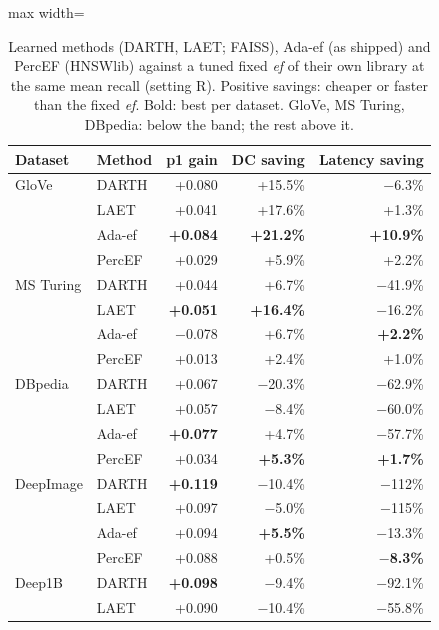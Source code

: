 \documentclass[10pt,journal,compsoc]{IEEEtran}
\newcommand{\ef}{\textit{ef}}
\begin{document}
\begin{table}[t]
  \caption{Learned methods (DARTH, LAET; FAISS), Ada-ef (as shipped) and PercEF (HNSWlib) against a
  tuned fixed \ef{} of their own library at the same mean recall (setting R). Positive savings:
  cheaper or faster than the fixed \ef{}. Bold: best per dataset. GloVe, MS Turing, DBpedia: below
  the band; the rest above it.}
  \label{tab:darth}
  \centering\footnotesize
  \begin{adjustbox}{max width=\linewidth}\begin{tabular}{llrrr}
    \toprule
    Dataset & Method & p1 gain & DC saving & Latency saving \\
    \midrule
    GloVe         & DARTH  & +0.080 & +15.5\% & $-$6.3\% \\
                  & LAET   & +0.041 & +17.6\% & +1.3\% \\
                  & Ada-ef & \textbf{+0.084} & \textbf{+21.2\%} & \textbf{+10.9\%} \\
                  & PercEF & +0.029 & +5.9\% & +2.2\% \\
    \midrule
    MS Turing     & DARTH  & +0.044 & +6.7\% & $-$41.9\% \\
                  & LAET   & \textbf{+0.051} & \textbf{+16.4\%} & $-$16.2\% \\
                  & Ada-ef & $-$0.078 & +6.7\% & \textbf{+2.2\%} \\
                  & PercEF & +0.013 & +2.4\% & +1.0\% \\
    \midrule
    DBpedia       & DARTH  & +0.067 & $-$20.3\% & $-$62.9\% \\
                  & LAET   & +0.057 & $-$8.4\% & $-$60.0\% \\
                  & Ada-ef & \textbf{+0.077} & +4.7\% & $-$57.7\% \\
                  & PercEF & +0.034 & \textbf{+5.3\%} & \textbf{+1.7\%} \\
    \midrule
    DeepImage     & DARTH  & \textbf{+0.119} & $-$10.4\% & $-$112\% \\
                  & LAET   & +0.097 & $-$5.0\% & $-$115\% \\
                  & Ada-ef & +0.094 & \textbf{+5.5\%} & $-$13.3\% \\
                  & PercEF & +0.088 & +0.5\% & \textbf{$-$8.3\%} \\
    \midrule
    Deep1B        & DARTH  & \textbf{+0.098} & $-$9.4\% & $-$92.1\% \\
                  & LAET   & +0.090 & $-$10.4\% & $-$55.8\% \\

\end{tabular}
\end{adjustbox}
\end{table}
\end{document}

